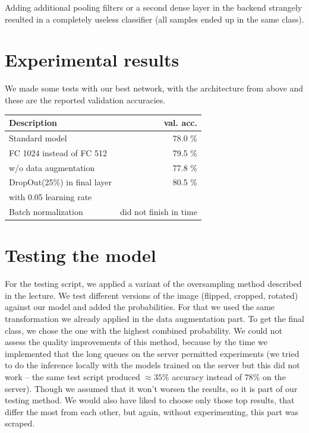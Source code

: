 Adding additional pooling filters or a second dense layer in the backend strangely resulted in a completely useless classifier (all samples ended up in the same class).

\section{Experimental results}
We made some tests with our best network, with the architecture from above and these are the reported validation accuracies.
\begin{center}
  \begin{tabular}{ | l | r |}
    \hline
    Description & val.  acc. \\ \hline
    Standard model & 78.0 \% \\ \hline
    FC 1024 instead of FC 512& 79.5 \%  \\ \hline
    w/o data augmentation & 77.8 \%  \\ \hline
    DropOut(25\%) in final layer & 80.5 \% \\with 0.05 learning rate &  \\ \hline
    Batch normalization &  did not finish in time\\
    \hline
  \end{tabular}
\end{center}

\section{Testing the model}
For the testing script, we applied a variant of the oversampling method described in the lecture. We test different versions of the image (flipped, cropped, rotated) against our model and added the probabilities. For that we used the same transformation we already applied in the data augmentation part. To get the final class, we chose the one with the highest combined probability. We could not assess the quality improvements of this method, because by the time we implemented that the long queues on the server permitted experiments (we tried to do the inference locally with the models trained on the server but this did not work -- the same test script produced $\approx 35\%$ accuracy instead of $78\%$ on the server). Though we assumed that it won't worsen the results, so it is part of our testing method. We would also have liked to choose only those top results, that differ the most from each other, but again, without experimenting, this part was scraped.


